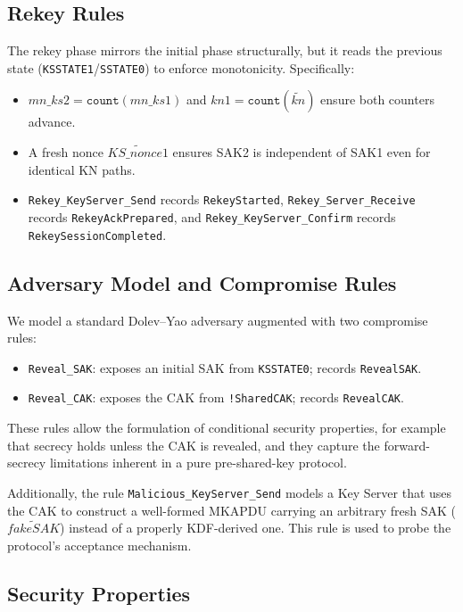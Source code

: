 \subsection{Rekey Rules}

The rekey phase mirrors the initial phase structurally, but it reads the previous state (\texttt{KSSTATE1}/\texttt{SSTATE0}) to enforce monotonicity. Specifically:

\begin{itemize}
  \item $\mathit{mn\_ks2} = \mathtt{count}(\mathit{mn\_ks1})$ and $\mathit{kn1} = \mathtt{count}(\tilde{\mathit{kn}})$ ensure both counters advance.
  \item A fresh nonce $\widetilde{\mathit{KS\_nonce1}}$ ensures SAK2 is independent of SAK1 even for identical KN paths.
  \item \texttt{Rekey\_KeyServer\_Send} records \texttt{RekeyStarted}, \texttt{Rekey\_Server\_Receive} records \texttt{RekeyAckPrepared}, and \texttt{Rekey\_KeyServer\_Confirm} records \texttt{RekeySessionCompleted}.
\end{itemize}

\subsection{Adversary Model and Compromise Rules}

We model a standard Dolev--Yao adversary augmented with two compromise rules:
\begin{itemize}
  \item \texttt{Reveal\_SAK}: exposes an initial SAK from \texttt{KSSTATE0}; records \texttt{RevealSAK}.
  \item \texttt{Reveal\_CAK}: exposes the CAK from \texttt{!SharedCAK}; records \texttt{RevealCAK}.
\end{itemize}
These rules allow the formulation of conditional security properties, for example that secrecy holds unless the CAK is revealed, and they capture the forward-secrecy limitations inherent in a pure pre-shared-key protocol.

Additionally, the rule \texttt{Malicious\_KeyServer\_Send} models a Key Server that uses the CAK to construct a well-formed MKAPDU carrying an arbitrary fresh SAK ($\widetilde{\mathit{fakeSAK}}$) instead of a properly KDF-derived one. This rule is used to probe the protocol's acceptance mechanism.

\subsection{Security Properties}
\label{sec:properties}

